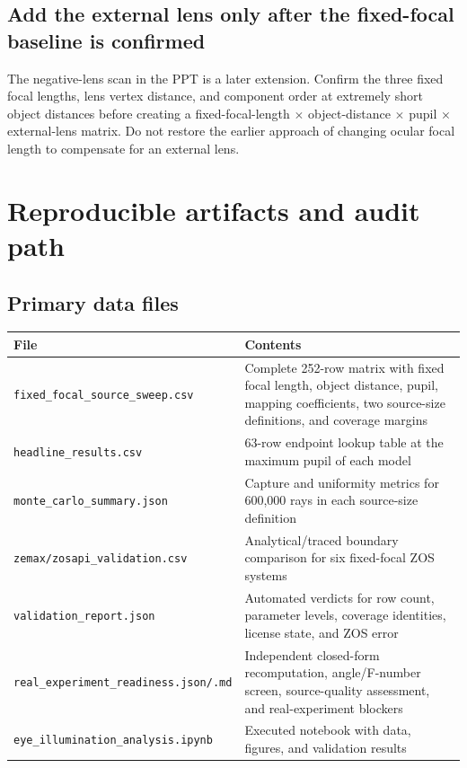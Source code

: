 \documentclass[11pt,openany]{report}
\newcommand{\sourcefile}[1]{\nolinkurl{#1}}
\begin{document}
\section{Add the external lens only after the fixed-focal baseline is confirmed}
The negative-lens scan in the PPT is a later extension. Confirm the three fixed focal lengths, lens vertex distance, and component order at extremely short object distances before creating a fixed-focal-length $\times$ object-distance $\times$ pupil $\times$ external-lens matrix. Do not restore the earlier approach of changing ocular focal length to compensate for an external lens.

\chapter{Reproducible artifacts and audit path}

\section{Primary data files}
\begin{longtable}{p{5.6cm}p{9.2cm}}
\toprule
File & Contents\\
\midrule
\sourcefile{fixed\_focal\_source\_sweep.csv} & Complete 252-row matrix with fixed focal length, object distance, pupil, mapping coefficients, two source-size definitions, and coverage margins\\
\sourcefile{headline\_results.csv} & 63-row endpoint lookup table at the maximum pupil of each model\\
\sourcefile{monte\_carlo\_summary.json} & Capture and uniformity metrics for 600,000 rays in each source-size definition\\
\sourcefile{zemax/zosapi\_validation.csv} & Analytical/traced boundary comparison for six fixed-focal ZOS systems\\
\sourcefile{validation\_report.json} & Automated verdicts for row count, parameter levels, coverage identities, license state, and ZOS error\\
\sourcefile{real\_experiment\_readiness.json/.md} & Independent closed-form recomputation, angle/F-number screen, source-quality assessment, and real-experiment blockers\\
\sourcefile{eye\_illumination\_analysis.ipynb} & Executed notebook with data, figures, and validation results\\
\bottomrule
\end{longtable}
\end{document}
